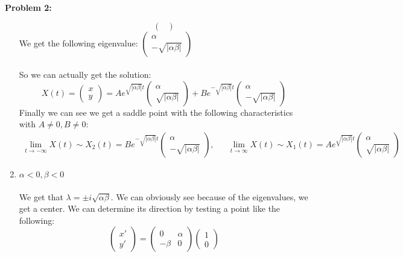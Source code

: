 \documentclass[11pt]{article}
\newenvironment{problem}[1]{\textbf{Problem #1: }}{\newpage}
\begin{document}
\begin{problem}{2}
\begin{enumerate}[label = (\roman*)]
\[\begin{pmatrix}
			\end{pmatrix}
			\]
			We get the following eigenvalue: $\begin{pmatrix}
			\alpha \\ -\sqrt{|\alpha\beta|}
			\end{pmatrix}$
			\\ \\
			So we can actually get the solution:
			\[X(t) = \begin{pmatrix}
				x \\ y
			\end{pmatrix} = Ae^{\sqrt{|\alpha\beta|} t}\begin{pmatrix}
			\alpha \\ \sqrt{|\alpha\beta|}
			\end{pmatrix} + Be^{-\sqrt{|\alpha\beta|} t}\begin{pmatrix}
			\alpha \\ -\sqrt{|\alpha\beta|}
			\end{pmatrix} \]
			Finally we can see we get a saddle point with the following characteristics with $A \not= 0, B \not=0$:	
			\begin{align*}
				\lim\limits_{t \rightarrow -\infty} X(t) \sim X_2(t) =  Be^{-\sqrt{|\alpha\beta|} t}\begin{pmatrix}
				\alpha \\ -\sqrt{|\alpha\beta|} \end{pmatrix}, && \lim\limits_{t \rightarrow \infty} X(t) \sim X_1(t) =  Ae^{\sqrt{|\alpha\beta|} t}\begin{pmatrix}
				\alpha \\ \sqrt{|\alpha\beta|}
				\end{pmatrix}
			\end{align*}
			\item \boldmath $\alpha < 0, \beta < 0$ \unboldmath
			\\ \\
			We get that $\lambda = \pm i \sqrt{\alpha\beta}$. 
			We can obviously see because of the eigenvalues, we get a center.  We can determine its direction by testing a point like the following:
			\[\begin{pmatrix}
			x' \\ y' 
			\end{pmatrix} = \begin{pmatrix}
			0 & \alpha \\
			-\beta & 0 
			\end{pmatrix}\begin{pmatrix}
			1 \\ 0

\end{pmatrix}\]
\end{enumerate}
\end{problem}
\end{document}
